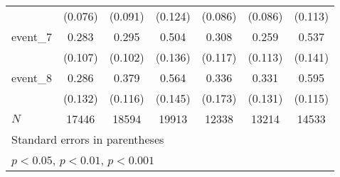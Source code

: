 {\begin{tabular}{l*{6}{c}}
            &     (0.076)         &     (0.091)         &     (0.124)         &     (0.086)         &     (0.086)         &     (0.113)         \\
[1em]
event\_7     &       0.283\sym{**} &       0.295\sym{**} &       0.504\sym{***}&       0.308\sym{**} &       0.259\sym{*}  &       0.537\sym{***}\\
            &     (0.107)         &     (0.102)         &     (0.136)         &     (0.117)         &     (0.113)         &     (0.141)         \\
[1em]
event\_8     &       0.286\sym{*}  &       0.379\sym{**} &       0.564\sym{***}&       0.336         &       0.331\sym{*}  &       0.595\sym{***}\\
            &     (0.132)         &     (0.116)         &     (0.145)         &     (0.173)         &     (0.131)         &     (0.115)         \\
\hline
\(N\)       &       17446         &       18594         &       19913         &       12338         &       13214         &       14533         \\
\hline\hline
\multicolumn{7}{l}{\footnotesize Standard errors in parentheses}\\
\multicolumn{7}{l}{\footnotesize \sym{*} \(p<0.05\), \sym{**} \(p<0.01\), \sym{***} \(p<0.001\)}\\
\end{tabular}
}
